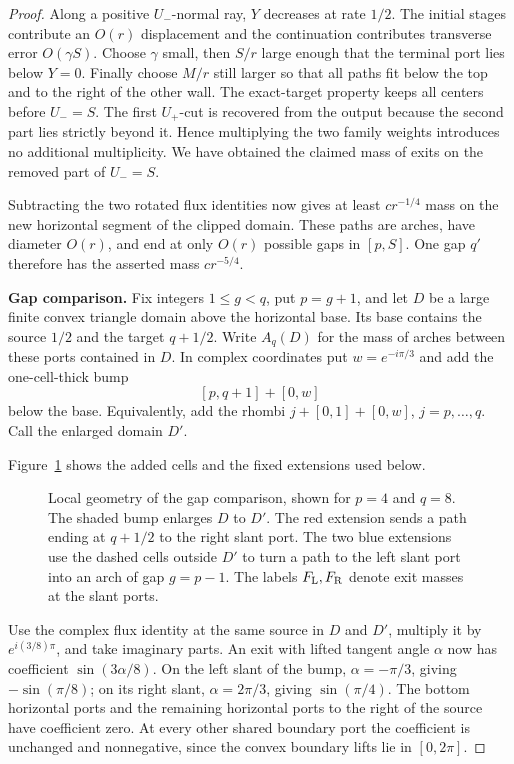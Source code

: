 \begin{proof}
Along a positive $U_-$-normal ray, $Y$ decreases at rate $1/2$.
The initial stages contribute an $O(r)$ displacement and the
continuation contributes transverse error $O(\gamma S)$.
Choose $\gamma$ small, then $S/r$ large enough that the terminal
port lies below $Y=0$.  Finally choose $M/r$ still larger so that
all paths fit below the top and to the right of the other wall.
The exact-target property keeps all centers before $U_-=S$.
The first $U_+$-cut is recovered from the output because the second
part lies strictly beyond it.  Hence multiplying the two family
weights introduces no additional multiplicity.  We have obtained
the claimed mass of exits on the removed part of $U_-=S$.

Subtracting the two rotated flux identities now gives at least
$cr^{-1/4}$ mass on the new horizontal segment of the clipped domain.
These paths are arches, have diameter $O(r)$, and end at only $O(r)$
possible gaps in $[p,S]$.  One gap $q'$ therefore has the asserted
mass $cr^{-5/4}$.

\medskip\noindent\textbf{Gap comparison.}
\label{L:cap-gap-comparison}
Fix integers $1\le g<q$, put $p=g+1$, and let $D$ be a large finite
convex triangle domain above the horizontal base.  Its base contains
the source $1/2$ and the target $q+1/2$.  Write $A_q(D)$ for the
mass of arches between these ports contained in $D$.  In complex
coordinates put $w=e^{-i\pi/3}$ and add the one-cell-thick bump
\[
 [p,q+1]+[0,w]
\]
below the base.  Equivalently, add the rhombi
$j+[0,1]+[0,w]$, $j=p,\ldots,q$.  Call the enlarged domain $D'$.

Figure~\ref{L:fig:cap-comparison} shows the added cells and the fixed
extensions used below.
\begin{figure}[htbp]
\centering
\caption{Local geometry of the gap comparison, shown for $p=4$ and $q=8$.
The shaded bump enlarges $D$ to $D'$. The red extension sends a path
ending at $q+1/2$ to the right slant port. The two blue extensions use
the dashed cells outside $D'$ to turn a path to the left slant port
into an arch of gap $g=p-1$. The labels $F_{\rm L},F_{\rm R}$ denote
exit masses at the slant ports.}\label{L:fig:cap-comparison}
\end{figure}

Use the complex flux identity at the same source in $D$ and $D'$,
multiply it by $e^{i(3/8)\pi}$, and take imaginary parts.  An exit
with lifted tangent angle $\alpha$ now has coefficient
$\sin(3\alpha/8)$.  On the left slant of the bump,
$\alpha=-\pi/3$, giving $-\sin(\pi/8)$; on its right slant,
$\alpha=2\pi/3$, giving $\sin(\pi/4)$.  The bottom horizontal
ports and the remaining horizontal ports to the right of the source
have coefficient zero.  At every other shared boundary port the
coefficient is unchanged and nonnegative, since the convex boundary
lifts lie in $[0,2\pi]$.


\end{proof}
